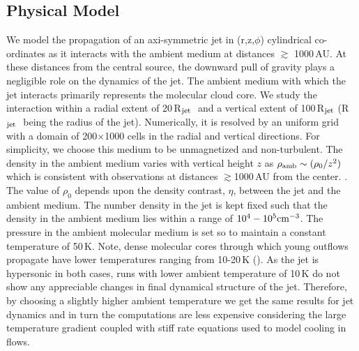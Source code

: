 \documentclass[useAMS,usenatbib]{mn2e}
\newcommand{\rj}{R$_{\rm jet}$}
\begin{document}
\subsection{Physical Model}
We model the propagation of an axi-symmetric jet
in (r,z,$\phi$) cylindrical co-ordinates as it interacts with the
ambient medium at distances $\gtrsim$ 1000\,AU. 
At these distances from the central source, the downward pull of gravity plays a
negligible role on the dynamics of the jet. The ambient medium with which the jet interacts primarily
represents the molecular cloud core. We study the interaction within a
radial extent of 20\,\rj\,\, and a vertical extent of 100\,\rj\,\,(\rj\,\, being the radius of
the jet). Numerically, it is resolved by an uniform grid with a domain
of 200$\times$1000 cells in the radial and vertical directions. For simplicity, we choose this medium
to be unmagnetized and non-turbulent. The density in the ambient
medium varies with vertical height $z$ as $\rho_{\rm amb}\sim (\rho_0/z^{2})$
which is consistent with observations at distances $\gtrsim$1000\,AU from the center. \citep[e.g.,][]{Keto:2010p15549}. The value of
$\rho_0$ depends upon the density contrast, $\eta$, between the jet and
the ambient medium. The number density in the jet is kept fixed such
that the density in the ambient medium lies within a range of $10^{4}-10^{5}
\rm cm^{-3}$. The pressure in the ambient molecular medium is
set so to maintain a constant temperature of 50\,K. Note, dense
molecular cores through which young outflows propagate
have lower temperatures ranging from 10-20\,K
(\citealt{Rathborne:2007p15753}). As the jet is hypersonic in both
cases, runs with lower ambient temperature of 10\,K do not show any 
appreciable changes in final dynamical structure of the jet. Therefore, by choosing a 
slightly higher ambient temperature we get the same results for jet dynamics and 
in turn the computations are less expensive considering the large
temperature gradient coupled with stiff rate equations used to model cooling in flows. 

%
\end{document}
